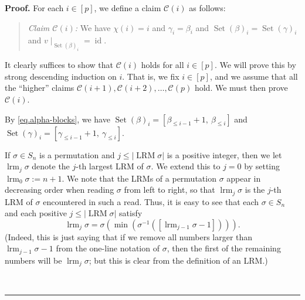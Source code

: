 \documentclass[submission]{FPSAC2026}
\newcommand{\id}{\operatorname{id}} %
\newcommand{\Set}{\operatorname{Set}}
\newcommand{\tup}[1]{\left( #1 \right)}
\newenvironment{proof}[1][Proof]{\noindent\textbf{#1.} }{\ \rule{0.5em}{0.5em}}
\begin{document}
\begin{proof}
For each $i\in\left[  p\right]  $, we define a claim $\mathcal{C}\tup{i}$
as follows:
\begin{quote}
\textit{Claim $\mathcal{C}\tup{i}$:}
We have $\chi\tup{i} = i$
and $\gamma_i = \beta_i$
and $\Set\tup{\beta}_i = \Set\tup{\gamma}_i$
and $\left. v\mid_{\Set\tup{\beta}_i} \right. = \id$.
\end{quote}
It clearly suffices to show that $\mathcal{C}\left(  i\right)  $ holds for all
$i\in\left[  p\right]  $. We will prove this by strong descending induction
on $i$. That is, we fix $i\in\left[  p\right]  $, and we assume that
all the ``higher'' claims
$\mathcal{C}\left(  i+1\right)  ,\mathcal{C}\left(  i+2\right)  ,\ldots
,\mathcal{C}\left(  p\right)  $ hold. We must then prove $\mathcal{C}\left(
i\right)  $.

By \eqref{eq.alpha-blocks},
we have $\operatorname*{Set}\left(
\beta\right)  _{i}=\left[  \beta_{\leq i-1}+1,\ \beta_{\leq i}\right]  $
and $\operatorname*{Set}\left(  \gamma\right)  _{i}=\left[
\gamma_{\leq i-1}+1,\ \gamma_{\leq i}\right]  $.

If $\sigma\in S_{n}$ is a permutation and $j\leq\left\vert \operatorname*{LRM}%
\sigma\right\vert $ is a positive integer, then we let $\operatorname*{lrm}%
\nolimits_{j}\sigma$ denote the $j$-th largest LRM of $\sigma$. We extend this
to $j=0$ by setting $\operatorname*{lrm}\nolimits_{0}\sigma:=n+1$. We note
that the LRMs of a permutation $\sigma$ appear in decreasing order when
reading $\sigma$ from left to right, so that $\operatorname*{lrm}%
\nolimits_{j}\sigma$ is the $j$-th LRM of $\sigma$ encountered in such a read.
Thus, it is easy to see that each $\sigma\in S_{n}$ and each positive
$j\leq\left\vert \operatorname*{LRM}\sigma\right\vert $ satisfy%
\begin{equation}
\operatorname*{lrm}\nolimits_{j}\sigma=\sigma\left(  \min\left(  \sigma
^{-1}\left(  \left[  \operatorname*{lrm}\nolimits_{j-1}\sigma-1\right]
\right)  \right)  \right)  .\label{pf.lem.wuv.lrm-min}%
\end{equation}
(Indeed, this is just saying that if we remove all numbers larger than
$\operatorname*{lrm}\nolimits_{j-1}\sigma-1$ from the one-line notation of
$\sigma$, then the first of the remaining numbers will be $\operatorname*{lrm}%
\nolimits_{j}\sigma$; but this is clear from the definition of an LRM.)


\end{proof}
\end{document}
